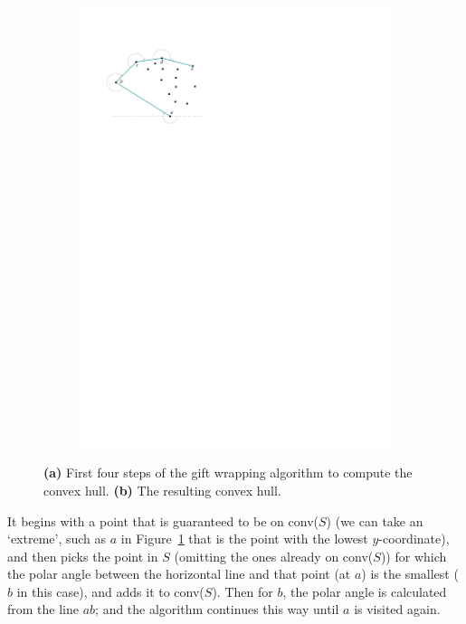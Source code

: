 \begin{figure}
\begin{subfigure}[b]{0.3\linewidth}
    \includegraphics[page=2,width=\textwidth]{figs/giftwrapping.pdf}
    \caption{}
  \end{subfigure}
  \caption{\textbf{(a)} First four steps of the gift wrapping algorithm to compute the convex hull. \textbf{(b)} The resulting convex hull.}
\label{fig:giftwrapping}
\end{figure}
It begins with a point that is guaranteed to be on conv($S$) (we can take an `extreme', such as $a$ in Figure~\ref{fig:giftwrapping} that is the point with the lowest $y$-coordinate), and then picks the point in $S$ (omitting the ones already on conv($S$)) for which the polar angle between the horizontal line and that point (at $a$) is the smallest ($b$ in this case), and adds it to conv($S$).
Then for $b$, the polar angle is calculated from the line $ab$; and the algorithm continues this way until $a$ is visited again.

